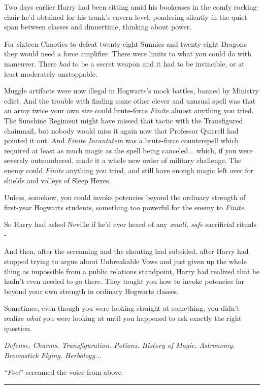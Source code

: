 Two days earlier Harry had been sitting amid his bookcases in the comfy rocking-chair he'd obtained for his trunk's cavern level, pondering silently in the quiet span between classes and dinnertime, thinking about power.

For sixteen Chaotics to defeat twenty-eight Sunnies and twenty-eight Dragons they would need a force amplifier. There were limits to what you could do with maneuver. There \emph{had} to be a secret weapon and it had to be invincible, or at least moderately unstoppable.

Muggle artifacts were now illegal in Hogwarts's mock battles, banned by Ministry edict. And the trouble with finding some other clever and unusual spell was that an army twice your own size could brute-force \emph{Finite} almost anything you tried. The Sunshine Regiment might have missed that tactic with the Transfigured chainmail, but nobody would miss it again now that Professor Quirrell had pointed it out. And \emph{Finite Incantatem} was a brute-force counterspell which required at least as much magic as the spell being canceled... which, if you were severely outnumbered, made it a whole new order of military challenge. The enemy could \emph{Finite} anything you tried, and still have enough magic left over for shields and volleys of Sleep Hexes.

Unless, somehow, you could invoke potencies beyond the ordinary strength of first-year Hogwarts students, something too powerful for the enemy to \emph{Finite}.

So Harry had asked Neville if he'd ever heard of any \emph{small, safe} sacrificial rituals -

And then, after the screaming and the shouting had subsided, after Harry had stopped trying to argue about Unbreakable Vows and just given up the whole thing as impossible from a public relations standpoint, Harry had realized that he hadn't even needed to go there. They taught you how to invoke potencies far beyond your own strength in ordinary Hogwarts classes.

Sometimes, even though you were looking straight at something, you didn't realize \emph{what} you were looking at until you happened to ask exactly the right question.

\emph{Defense. Charms. Transfiguration. Potions. History of Magic. Astronomy. Broomstick Flying. Herbology...}

``\emph{Foe!}'' screamed the voice from above.

\begin{center}\rule{3in}{0.4pt}\end{center}


